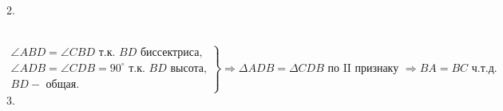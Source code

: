 \documentclass[12pt]{article}
\begin{document}
2.  \begin{figure}[ht!]
\end{figure}\\
$\left.\begin{array}{l}\angle ABD=\angle CBD\text{ т.к. }BD\text{ биссектриса,}\\
\angle ADB=\angle CDB=90^\circ \text{ т.к. }BD\text{ высота,}\\
BD - \text{ общая.}   \end{array}\right\}\Rightarrow
\Delta ADB=\Delta CDB\text{ по II признаку }\Rightarrow BA=BC\text{ ч.т.д.} $\\
3. \begin{figure}[ht!]
\end{figure}\\
\end{document}
